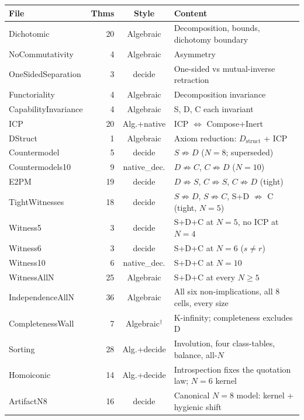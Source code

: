 \documentclass[sigconf,screen]{acmart}
\theoremstyle{remark}
\begin{document}
\medskip
{\small
\begin{tabular}{lrcl}
\textbf{File} & \textbf{Thms} & \textbf{Style} & \textbf{Content} \\
\hline
Dichotomic & 20 & Algebraic & Decomposition, bounds, dichotomy boundary \\
NoCommutativity      &  4 & Algebraic & Asymmetry \\
OneSidedSeparation   &  3 & decide & One-sided vs mutual-inverse retraction \\
Functoriality        &  4 & Algebraic & Decomposition invariance \\
CapabilityInvariance &  4 & Algebraic & S, D, C each invariant \\
ICP                  & 20 & Alg.+native & ICP $\Leftrightarrow$ Compose+Inert \\
DStruct              &  1 & Algebraic & Axiom reduction: $D_{\mathrm{struct}}$ + ICP \\
Countermodel         &  5 & decide & $S \not\Rightarrow D$ ($N\!=\!8$; superseded) \\
Countermodels10      &  9 & native\_dec. & $D \not\Rightarrow C$, $C \not\Rightarrow D$ ($N\!=\!10$) \\
E2PM                 & 19 & decide & $D \not\Rightarrow S$, $C \not\Rightarrow S$, $C \not\Rightarrow D$ (tight) \\
TightWitnesses       & 18 & decide & $S \not\Rightarrow D$, $S \not\Rightarrow C$, S+D $\not\Rightarrow$ C (tight, $N\!=\!5$) \\
Witness5             &  3 & decide & S+D+C at $N\!=\!5$, no ICP at $N\!=\!4$ \\
Witness6             &  3 & decide & S+D+C at $N\!=\!6$ ($s \neq r$) \\
Witness10            &  6 & native\_dec. & S+D+C at $N\!=\!10$ \\
WitnessAllN          & 25 & Algebraic & S+D+C at every $N \geq 5$ \\
IndependenceAllN     & 36 & Algebraic & All six non-implications, all 8 cells, every size \\
CompletenessWall     &  7 & Algebraic$^\dagger$ & K-infinity; completeness excludes D \\
Sorting              & 28 & Alg.+decide & Involution, four class-tables, balance, all-$N$ \\
Homoiconic           & 14 & Alg.+decide & Introspection fixes the quotation law; $N\!=\!6$ kernel \\
ArtifactN8           & 16 & decide & Canonical $N\!=\!8$ model: kernel + hygienic shift \\

\end{tabular}}
\end{document}
